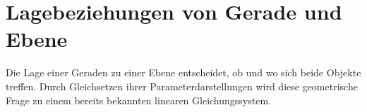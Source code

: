 \section{Lagebeziehungen von Gerade und Ebene}
\label{sec:analytic_geometry_line_plane_relationships}

Die Lage einer Geraden zu einer Ebene entscheidet, ob und wo sich beide
Objekte treffen. Durch Gleichsetzen ihrer Parameterdarstellungen wird diese
geometrische Frage zu einem bereits bekannten linearen Gleichungssystem.


